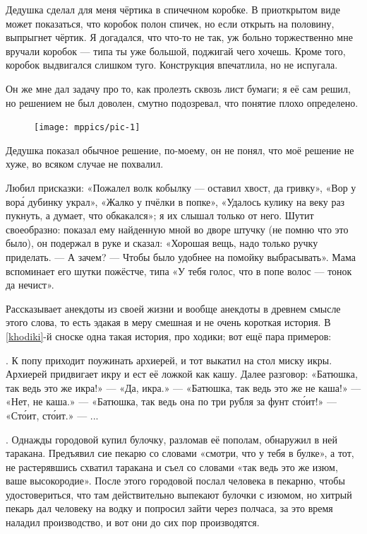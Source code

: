 \documentclass{book}
\begin{document}
Дедушка сделал для меня чёртика в спичечном коробке.
В приоткрытом виде может показаться, что коробок полон спичек,
но если открыть на половину, выпрыгнет чёртик.
Я  догадался, что что-то не так, уж больно торжественно мне вручали коробок --- типа ты уже большой, поджигай чего хочешь.
Кроме того, коробок выдвигался слишком туго.
Конструкция впечатлила, но не испугала.

Он же мне дал задачу про то, как пролезть сквозь лист бумаги;
я её сам решил, но решением не был доволен, смутно подозревал, что понятие  плохо определено.
\begin{figure}[ht!]
\vskip-0mm
\centering
\texttt{[image: mppics/pic-1]}
\end{figure}
Дедушка показал обычное решение, по-моему, он не понял, что моё решение не хуже, во всяком случае не похвалил.

Любил присказки: «Пожалел волк кобылку --- оставил хвост, да гривку», «Вор у вор\'{а} дубинку украл», «Жалко у пчёлки в попке», «Удалось кулику на веку раз пукнуть, а думает, что обкакался»; я их слышал только от него.
Шутит своеобразно: показал ему найденную мной во дворе штучку (не помню что это было), он подержал в руке и сказал: «Хорошая вещь, надо только ручку приделать.
--- А зачем? --- Чтобы было удобнее на помойку выбрасывать».
Мама вспоминает его шутки пожёстче, типа «У тебя голос, что в попе волос --- тонок да нечист».

Рассказывает анекдоты из своей жизни и вообще анекдоты в древнем смысле этого слова, то есть эдакая в меру смешная и не очень короткая история.
В \ref{khodiki}-й сноске одна такая история, про ходики; вот ещё пара примеров:

.
К попу приходит поужинать архиерей, и тот выкатил на стол миску икры.
Архиерей придвигает икру и ест её ложкой как кашу.
Далее разговор: 
«Батюшка, так ведь это же икра!»
--- «Да, икра.»
--- «Батюшка, так ведь это же не каша!»
--- «Нет, не каша.»
--- «Батюшка, так ведь она по три рубля за фунт ст\'{о}ит!»
--- «Ст\'{о}ит, ст\'{о}ит.» --- ...

.
Однажды городовой купил булочку, разломав её пополам, обнаружил в ней таракана.
Предъявил сие пекарю со словами «смотри, что у тебя в булке», а тот, не растерявшись схватил таракана и съел со словами «так ведь это же изюм, ваше высокородие».
После этого городовой послал человека в пекарню, чтобы удостовериться, что там действительно выпекают булочки с изюмом, но хитрый пекарь дал человеку на водку и попросил зайти через полчаса, за это время наладил производство, и вот они до сих пор производятся.
\end{document}
